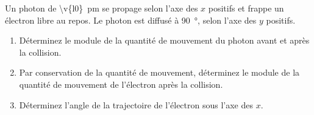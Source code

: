 Un photon de \qty{\v{l0}}{pm} se propage selon l'axe des $x$ positifs et frappe un électron libre au repos. Le photon est diffusé à \qty{90}{\degree}, selon l'axe des $y$ positifs.

\begin{enumerate}[label=\alph*)]
    \item Déterminez le module de la quantité de mouvement du photon avant et après la collision.
    \item Par conservation de la quantité de mouvement, déterminez le module de la quantité de mouvement de l'électron après la collision.
    \item Déterminez l'angle de la trajectoire de l'électron sous l'axe des $x$.
\end{enumerate}
